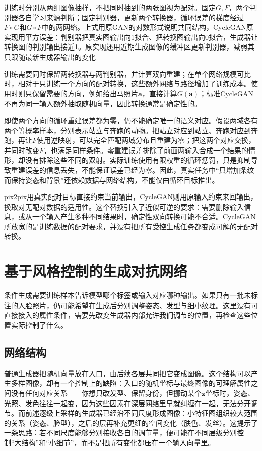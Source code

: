 训练时分别从两组图像抽样，不把同时抽到的两张图视为配对。固定$G,F$，两个判别器各自学习来源判断；固定判别器，更新两个转换器，循环误差的梯度经过$F\circ G$和$G\circ F$中的两网络。上式用原GAN的对数形式说明共同结构，CycleGAN原实现用平方误差：判别器把真实图输出向1拟合、把转换图输出向0拟合，生成器让转换图的判别输出接近1。原实现还用近期生成图像的缓冲区更新判别器，减弱其只跟随最新生成器输出的变化

训练需要同时保留两转换器与两判别器，并计算双向重建；在单个网络规模可比时，相对于只训练一个方向的配对转换，这些额外网络与路径增加了训练成本。使用时则只保留需要的方向，例如给出马照片$\bm{a}$，直接计算$G(\bm{a})$；标准CycleGAN不再为同一输入额外抽取随机向量，因此转换通常是确定性的。

即使两个方向的循环重建误差都为零，仍不能确定唯一的语义对应。假设两域各有两个等概率样本，分别表示站立与奔跑的动物。把站立对应到站立、奔跑对应到奔跑，再让$F$使用逆映射，可以完全匹配两域分布且重建为零；把这两个对应交换，并同时改变$F$，也满足同样条件。零重建误差排除了前面两输入合成一个结果的情形，却没有排除这些不同的双射。实际训练使用有限权重的循环惩罚，只是抑制导致重建误差的信息丢失，不能保证误差已经为零。因此，真实任务中“只增加条纹而保持姿态和背景”还依赖数据与网络结构，不能仅由循环目标推出。

pix2pix用真实配对目标直接约束当前输出，CycleGAN则用原输入约束来回输出，换取对无配对数据的适用性。这个替换引入了近似可逆的要求：需要删除输入信息，或从一个输入产生多种不同结果时，确定性双向转换可能不合适。CycleGAN所放宽的是训练数据的配对要求，并没有把所有受控生成任务都变成可解的无配对转换。

\section{基于风格控制的生成对抗网络}
\label{sec:neural-generative-stylegan}

条件生成需要训练样本告诉模型哪个标签或输入对应哪种输出。如果只有一批未标注的人脸照片，仍可能希望在生成后分别调整姿态、发型与细小纹理。这里没有可直接接入的属性条件，需要先改变生成器内部允许我们调节的位置，再检查这些位置实际控制了什么。

\subsection{网络结构}
\label{sec:neural-generative-stylegan-structure}

普通生成器把随机向量放在入口，由后续各层共同把它变成图像。这个结构可以产生多样图像，却有一个控制上的缺陷：入口的随机坐标与最终图像的可理解属性之间没有任何对应关系——你想只改发型、保留身份，但挪动某个$\bm z$坐标时，姿态、光照、发色往往一起变，因为这些因素在深层网络里早就纠缠在一起，无法分开调节。而前述逐级上采样的生成器已经沿不同尺度形成图像：小特征图组织较大范围的关系（姿态、脸型），之后的层再补充更细的空间变化（肤色、发丝）。这提示了一条思路：若不同尺度能够分别接收各自的调节量，便可能在不同层级分别控制“大结构”和“小细节”，而不是把所有变化都压在一个输入向量里。

